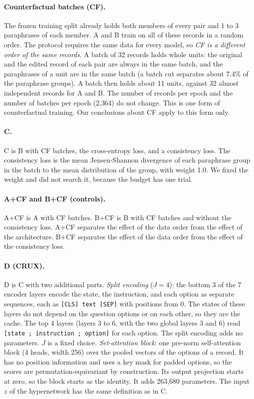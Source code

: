\documentclass[11pt,a4paper]{article}
\begin{document}
\paragraph{Counterfactual batches (CF).}
The frozen training split already holds both members of every pair and 1 to 3 paraphrases of each member.
A and B train on all of these records in a random order.
The protocol requires the same data for every model, so \emph{CF is a different order of the same records}.
A batch of 32 records holds whole units: the original and the edited record of each pair are always in the same batch, and the paraphrases of a unit are in the same batch (a batch cut separates about 7.4\% of the paraphrase groups).
A batch then holds about 11 units, against 32 almost independent records for A and B.
The number of records per epoch and the number of batches per epoch (2{,}364) do not change.
This is one form of counterfactual training.
Our conclusions about CF apply to this form only.

\paragraph{C.}
C is B with CF batches, the cross-entropy loss, and a consistency loss.
The consistency loss is the mean Jensen-Shannon divergence of each paraphrase group in the batch to the mean distribution of the group, with weight 1.0.
We fixed the weight and did not search it, because the budget has one trial.

\paragraph{A+CF and B+CF (controls).}
A+CF is A with CF batches.
B+CF is B with CF batches and without the consistency loss.
A+CF separates the effect of the data order from the effect of the architecture.
B+CF separates the effect of the data order from the effect of the consistency loss.

\paragraph{D (CRUX).}
D is C with two additional parts.
\emph{Split encoding} ($J = 4$): the bottom 3 of the 7 encoder layers encode the state, the instruction, and each option as separate sequences, each as \texttt{[CLS] text [SEP]} with positions from 0.
The states of these layers do not depend on the question options or on each other, so they are the cache.
The top 4 layers (layers 3 to 6, with the two global layers 3 and 6) read \texttt{[state ; instruction ; option]} for each option.
The split encoding adds no parameters.
$J$ is a fixed choice.
\emph{Set-attention block}: one pre-norm self-attention block (4 heads, width 256) over the pooled vectors of the options of a record.
It has no position information and uses a key mask for padded options, so the scores are permutation-equivariant by construction.
Its output projection starts at zero, so the block starts as the identity.
It adds 263{,}680 parameters.
The input $z$ of the hypernetwork has the same definition as in C.
\end{document}
